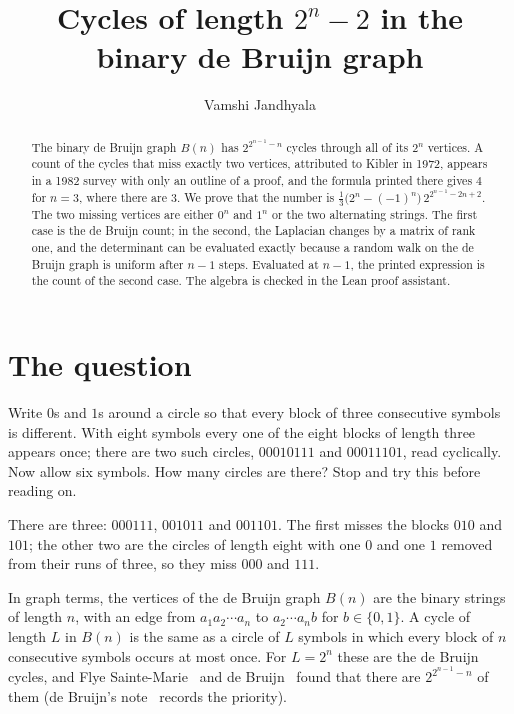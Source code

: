 \documentclass[11pt]{article}
\title{Cycles of length $2^n-2$ in the binary de Bruijn graph}
\author{Vamshi Jandhyala}
\date{}
\theoremstyle{remark}
\begin{document}
\maketitle
\vspace{-2em}

\begin{abstract}
The binary de Bruijn graph $B(n)$ has $2^{2^{n-1}-n}$ cycles through all of its $2^n$ vertices. A count of
the cycles that miss exactly two vertices, attributed to Kibler in 1972, appears in a 1982 survey with only an
outline of a proof, and the formula printed there gives $4$ for $n=3$, where there are $3$. We prove that the number is
$\tfrac13\bigl(2^n-(-1)^n\bigr)\,2^{2^{n-1}-2n+2}$. The two missing vertices are either $0^n$ and $1^n$ or the
two alternating strings. The first case is the de Bruijn count; in the second, the Laplacian changes by a
matrix of rank one, and the determinant can be evaluated exactly because a random walk on the de Bruijn graph
is uniform after $n-1$ steps. Evaluated at $n-1$, the printed expression is the count of the second case. The algebra
is checked in the Lean proof assistant.
\end{abstract}

\section{The question}

Write $0$s and $1$s around a circle so that every block of three consecutive symbols is different. With eight
symbols every one of the eight blocks of length three appears once; there are two such circles, $00010111$
and $00011101$, read cyclically. Now allow six symbols. How many circles are there? Stop and try this before
reading on.

There are three: $000111$, $001011$ and $001101$. The first misses the blocks $010$ and $101$; the other two
are the circles of length eight with one $0$ and one $1$ removed from their runs of three, so they miss $000$
and $111$.

In graph terms, the vertices of the de Bruijn graph $B(n)$ are the binary strings of length $n$, with an edge
from $a_1a_2\cdots a_n$ to $a_2\cdots a_nb$ for $b\in\{0,1\}$. A cycle of length $L$ in $B(n)$ is the same as
a circle of $L$ symbols in which every block of $n$ consecutive symbols occurs at most once. For $L=2^n$ these
are the de Bruijn cycles, and Flye Sainte-Marie~\cite{FSM} and de Bruijn~\cite{dB46} found that there are
$2^{2^{n-1}-n}$ of them (de Bruijn's note~\cite{dB75} records the priority).
\end{document}
